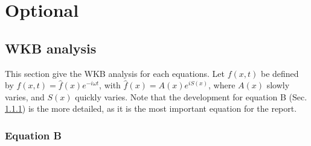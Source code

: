 \documentclass[a4paper,12pt,twoside]{article}
\begin{document}
\newpage

\section{Optional}
  \subsection{WKB analysis}\label{sec:WKB}
    This section give the WKB analysis for each equations.
    Let $f(x,t)$ be defined by $f(x,t) = \hat{f}(x)e^{-i\omega t}$, with $\hat{f}(x) = A(x)e^{iS(x)}$, where $A(x)$ slowly varies, and $S(x)$ quickly varies.
    Note that the development for equation B (Sec. \ref{sec:WKB-B}) is the more detailed, as it is the most important equation for the report.

    \subsubsection{Equation B}\label{sec:WKB-B}
\end{document}
